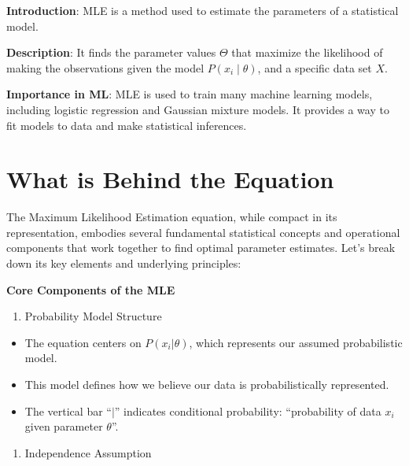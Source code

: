 \documentclass[
  12 pt,
  a4paper,
]{book}
\providecommand{\tightlist}{%
  \setlength{\itemsep}{0pt}\setlength{\parskip}{0pt}}
\numberwithin{equation}{section}
\theoremstyle{plain}      %
\theoremstyle{definition} %
\theoremstyle{remark}     %
\theoremstyle{note}         %
\begin{document}
\textbf{Introduction}: MLE is a method used to estimate the parameters
of a statistical model.

\textbf{Description}: It finds the parameter values \(\Theta\) that
maximize the likelihood of making the observations given the model
\(P(x_i\! \mid\! \theta)\), and a specific data set \(X\).

\textbf{Importance in ML}: MLE is used to train many machine learning
models, including logistic regression and Gaussian mixture models. It
provides a way to fit models to data and make statistical inferences.

\vspace*{\fill}

\newpage

\hypertarget{what-is-behind-the-equation-6}{%
\section{What is Behind the
Equation}\label{what-is-behind-the-equation-6}}

The Maximum Likelihood Estimation equation, while compact in its
representation, embodies several fundamental statistical concepts and
operational components that work together to find optimal parameter
estimates. Let's break down its key elements and underlying principles:

\textbf{Core Components of the MLE}

\begin{enumerate}
\def\labelenumi{\arabic{enumi}.}
\tightlist
\item
  Probability Model Structure
\end{enumerate}

\begin{itemize}
\tightlist
\item
  The equation centers on \(P(x_i|\theta)\), which represents our
  assumed probabilistic model.
\item
  This model defines how we believe our data is probabilistically
  represented.
\item
  The vertical bar ``\(\mid\)'' indicates conditional probability:
  ``probability of data \(x_i\) given parameter \(\theta\)''.
\end{itemize}

\begin{enumerate}
\def\labelenumi{\arabic{enumi}.}
\setcounter{enumi}{1}
\tightlist
\item
  Independence Assumption
\end{enumerate}
\end{document}
